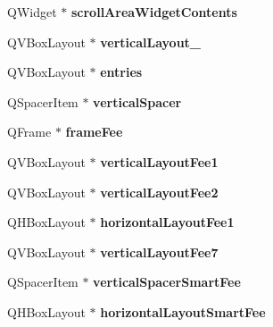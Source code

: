 \begin{DoxyCompactItemize}
Q\+Widget $\ast$ {\bfseries scroll\+Area\+Widget\+Contents}
\item 
\mbox{\label{class_ui___send_coins_dialog_a1af9ab6502603eb7dc0021a299207b5a}} 
Q\+V\+Box\+Layout $\ast$ {\bfseries vertical\+Layout\+\_}
\item 
\mbox{\label{class_ui___send_coins_dialog_ab7d34fb576e29ebb5112476d2b356936}} 
Q\+V\+Box\+Layout $\ast$ {\bfseries entries}
\item 
\mbox{\label{class_ui___send_coins_dialog_a87bed88d6345c0ccf0d037eb9ab2b0f0}} 
Q\+Spacer\+Item $\ast$ {\bfseries vertical\+Spacer}
\item 
\mbox{\label{class_ui___send_coins_dialog_a13063bf0244276df643451c36c288c68}} 
Q\+Frame $\ast$ {\bfseries frame\+Fee}
\item 
\mbox{\label{class_ui___send_coins_dialog_afdbc48ae268639b6a932201c597bd017}} 
Q\+V\+Box\+Layout $\ast$ {\bfseries vertical\+Layout\+Fee1}
\item 
\mbox{\label{class_ui___send_coins_dialog_a19f696136bb64f2412863f30e910a5ac}} 
Q\+V\+Box\+Layout $\ast$ {\bfseries vertical\+Layout\+Fee2}
\item 
\mbox{\label{class_ui___send_coins_dialog_a1850eab8eda743c943ee8ea34ceac8e8}} 
Q\+H\+Box\+Layout $\ast$ {\bfseries horizontal\+Layout\+Fee1}
\item 
\mbox{\label{class_ui___send_coins_dialog_a30685dd9d9d233140d03874ce2e9d4de}} 
Q\+V\+Box\+Layout $\ast$ {\bfseries vertical\+Layout\+Fee7}
\item 
\mbox{\label{class_ui___send_coins_dialog_a46be8c01641cb4f6256f222bc5e354f7}} 
Q\+Spacer\+Item $\ast$ {\bfseries vertical\+Spacer\+Smart\+Fee}
\item 
\mbox{\label{class_ui___send_coins_dialog_a1a2c8e6e097f85822fc41183505ea1ab}} 
Q\+H\+Box\+Layout $\ast$ {\bfseries horizontal\+Layout\+Smart\+Fee}

\end{DoxyCompactItemize}
